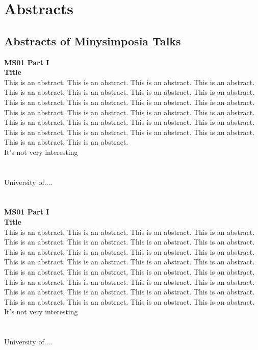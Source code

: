 

\part{Abstracts}



\chapter*{Abstracts of Minysimposia Talks}

\begin{multicols}{2}
\noindent\textbf{MS01 Part I}\\
\textbf{Title}\\
 This is an abstract. This is an abstract. This is an abstract. This is an abstract. This is an abstract. This is an abstract. This is an abstract. This is an abstract. This is an abstract. This is an abstract. This is an abstract. This is an abstract. This is an abstract. This is an abstract. This is an abstract. This is an abstract. This is an abstract. This is an abstract. This is an abstract. This is an abstract. This is an abstract. This is an abstract. This is an abstract. This is an abstract. This is an abstract. This is an abstract. \\It's not very interesting\\\\
\\
University of....\\
\\\\

\noindent\textbf{MS01 Part I}\\
\textbf{Title}\\
This is an abstract. This is an abstract. This is an abstract. This is an abstract. This is an abstract. This is an abstract. This is an abstract. This is an abstract. This is an abstract. This is an abstract. This is an abstract. This is an abstract. This is an abstract. This is an abstract. This is an abstract. This is an abstract. This is an abstract. This is an abstract. This is an abstract. This is an abstract. This is an abstract. This is an abstract. This is an abstract. This is an abstract. This is an abstract. This is an abstract. This is an abstract. This is an abstract. This is an abstract. This is an abstract. This is an abstract. This is an abstract. \\It's not very interesting\\\\
\\
University of....\\
\\\\


\end{multicols}
